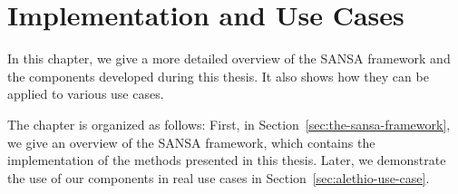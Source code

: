 \chapter{Implementation and Use Cases}
\label{chapter:implementation_and_use_cases}
In this chapter, we give a more detailed overview of the SANSA framework and the components developed during this thesis.
It also shows how they can be applied to various use cases.



The chapter is organized as follows: First, in Section~\ref{sec:the-sansa-framework}, we give an overview of the SANSA framework, which contains the implementation of the methods presented in this thesis.
Later, we demonstrate the use of our components in real use cases in Section~\ref{sec:alethio-use-case}.

